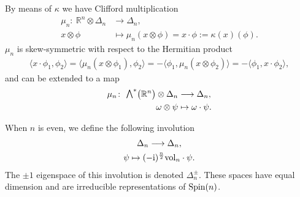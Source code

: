 \documentclass[10pt,a4paper]{amsart}
\newcommand{\ext}{\raise1pt\hbox{\small$\bigwedge$}}
\newcommand{\lra}{\longrightarrow}
\numberwithin{equation}{section}
\begin{document}
By means of $\kappa$ we have Clifford multiplication
\begin{align*}
\mu_n\colon \ \mathbb{R}^n\otimes \Delta_n &\lra \Delta_n,\\
x \otimes \phi &\mapsto \mu_n(x\otimes \phi)=x\cdot\phi :=\kappa(x)(\phi) .
\end{align*}
$\mu_n$ is skew-symmetric with respect to the Hermitian product
\begin{gather}
\langle x\cdot\phi_1 , \phi_2\rangle =\langle \mu_n(x\otimes \phi_1) , \phi_2\rangle =-\langle \phi_1 , \mu_n(x\otimes \phi_2)\rangle
=-\langle \phi_1 , x\cdot \phi_2\rangle , \label{clifford-skew-symmetric}
\end{gather}
and can be extended to a map
\begin{align*}
\mu_n\colon \ \ext^*\big(\mathbb{R}^n\big)\otimes \Delta_n &\lra \Delta_n,\\
\omega \otimes \psi &\mapsto \omega\cdot\psi.
\end{align*}

When $n$ is even, we define the following involution
\begin{gather*}
\Delta_n \longrightarrow \Delta_n, \\
\psi \mapsto (-{\rm i})^{n\over 2}{\rm vol}_n\cdot \psi.
\end{gather*}
The $\pm 1$ eigenspace of this involution is denoted $\Delta_n^\pm$. These spaces have equal dimension and are irreducible representations of ${\rm Spin}(n)$.
\end{document}
